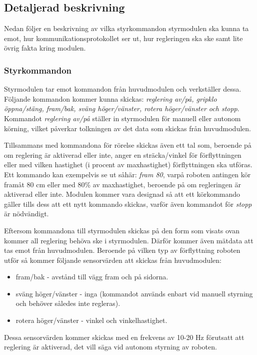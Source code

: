 \documentclass[11pt]{article}
\begin{document}
\begin{flushleft}
\subsection{Detaljerad beskrivning}
Nedan följer en beskrivning av vilka styrkommandon styrmodulen ska kunna ta emot, hur kommunikationsprotokollet ser ut, hur regleringen ska ske samt lite övrig fakta kring modulen.

\subsubsection{Styrkommandon}\label{Styrkommandon}
Styrmodulen tar emot kommandon från huvudmodulen och verkställer dessa. Följande kommandon kommer kunna skickas: \textit{reglering av/på, gripklo öppna/stäng, fram/bak, sväng höger/vänster, rotera höger/vänster och stopp}. Kommandot \textit{reglering av/på} ställer in styrmodulen för manuell eller autonom körning, vilket påverkar tolkningen av det data som skickas från huvudmodulen.

Tillsammans med kommandona för rörelse skickas även ett tal som, beroende på om reglering är aktiverad eller inte, anger en sträcka/vinkel för förflyttningen eller med vilken hastighet (i procent av maxhastighet) förflyttningen ska utföras. Ett kommando kan exempelvis se ut såhär: \textit{fram 80}, varpå roboten antingen kör framåt 80 cm eller med 80\% av maxhastighet, beroende på om regleringen är aktiverad eller inte. Modulen kommer vara designad så att ett körkommando gäller tills dess att ett nytt kommando skickas, varför även kommandot för \textit{stopp} är nödvändigt.

Eftersom kommandona till styrmodulen skickas på den form som visats ovan kommer all reglering behöva ske i styrmodulen. Därför kommer även mätdata att tas emot från huvudmodulen. Beroende på vilken typ av förflyttning roboten utför så kommer följande sensorvärden att skickas från huvudmodulen:
\begin{itemize}
	\item fram/bak - avstånd till vägg fram och på sidorna.
	\item sväng höger/vänster - inga (kommandot används enbart vid manuell styrning och behöver således inte regleras).
	\item rotera höger/vänster - vinkel och vinkelhastighet.
\end{itemize}
Dessa sensorvärden kommer skickas med en frekvens av 10-20 Hz förutsatt att reglering är aktiverad, det vill säga vid autonom styrning av roboten.


\end{flushleft}
\end{document}
